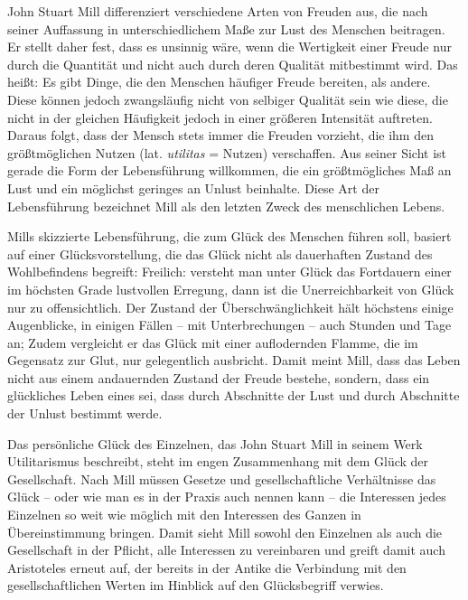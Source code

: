 John Stuart Mill differenziert verschiedene Arten von Freuden aus, die nach seiner Auffassung in unterschiedlichem Maße zur Lust des Menschen beitragen. 
Er stellt daher fest, dass es unsinnig wäre, wenn die Wertigkeit einer Freude nur durch die Quantität und nicht auch durch deren Qualität mitbestimmt wird\cite[S.\,15]{JM94}. 
Das heißt: Es gibt Dinge, die den Menschen häufiger Freude bereiten, als andere. 
Diese können jedoch zwangsläufig nicht von selbiger Qualität sein wie diese, die nicht in der gleichen Häufigkeit jedoch in einer größeren Intensität auftreten. 
Daraus folgt, dass der Mensch stets immer die Freuden vorzieht, die ihm den größtmöglichen Nutzen (lat. \textit{utilitas} = Nutzen) verschaffen. 
Aus seiner Sicht ist gerade die Form der Lebensführung willkommen, die ein größtmögliches Maß an Lust und ein möglichst geringes an Unlust beinhalte. 
Diese Art der Lebensführung bezeichnet Mill als den letzten Zweck des menschlichen Lebens\cite[S.\,21]{JM94}.

Mills skizzierte Lebensführung, die zum Glück des Menschen führen soll, basiert auf einer Glücksvorstellung, die das Glück nicht als dauerhaften Zustand des Wohlbefindens begreift: 
\glqq Freilich: versteht man unter Glück das Fortdauern einer im höchsten Grade lustvollen Erregung, dann ist die Unerreichbarkeit von Glück nur zu offensichtlich. 
Der Zustand der Überschwänglichkeit hält höchstens einige Augenblicke, in einigen Fällen -- mit Unterbrechungen -- auch Stunden und Tage an;\grqq{}\cite[S.\,23]{JM94}
 Zudem vergleicht er das Glück mit einer auflodernden Flamme, die im Gegensatz zur Glut, nur gelegentlich ausbricht. 
 Damit meint Mill, dass das Leben nicht aus einem andauernden Zustand der Freude bestehe, sondern, dass ein glückliches Leben eines sei, dass durch Abschnitte der Lust und durch Abschnitte der Unlust bestimmt werde.
 
Das persönliche Glück des Einzelnen, das John Stuart Mill in seinem Werk \glqq Utilitarismus\grqq{} beschreibt, steht im engen Zusammenhang mit dem Glück der Gesellschaft. 
Nach Mill müssen \glqq Gesetze und gesellschaftliche Verhältnisse das Glück -- oder wie man es in der Praxis auch nennen kann -- die Interessen jedes Einzelnen so weit wie möglich mit den Interessen des Ganzen in Übereinstimmung bringen.\grqq{}\cite[S.\,30]{JM94}
Damit sieht Mill sowohl den Einzelnen als auch die Gesellschaft in der Pflicht, alle Interessen zu vereinbaren und greift damit auch Aristoteles erneut auf, der bereits in der Antike die Verbindung mit den gesellschaftlichen Werten im Hinblick auf den Glücksbegriff verwies.

